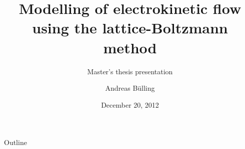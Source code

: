 \documentclass[10pt, handout]{beamer} %
\title{Modelling of electrokinetic flow using the lattice-Boltzmann
  method}
\subtitle{Master's thesis presentation} %
\author[A. B\"ulling]{Andreas B\"ulling} %
\institute{Chalmers University of Technology}
\date{December 20, 2012}
\begin{document}
\begin{frame}[plain]
  \titlepage
\end{frame}

\begin{frame}{Outline}
  \tableofcontents[pausesections]
\end{frame}








\end{document}
